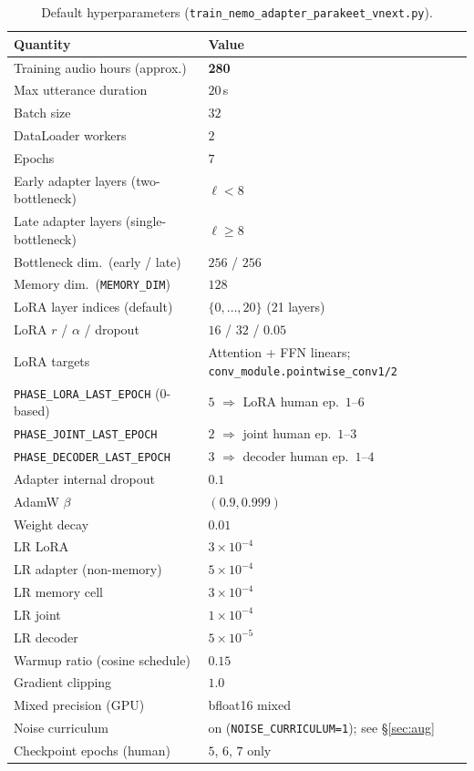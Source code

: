 \documentclass[11pt,a4paper]{article}
\begin{document}
\begin{table}[htbp]
  \centering
  \caption{Default hyperparameters (\texttt{train\_nemo\_adapter\_parakeet\_vnext.py}).}
  \label{tab:hyp}
  \begin{tabular}{@{}ll@{}}
    \toprule
    Quantity & Value \\
    \midrule
    Training audio hours (approx.) & \textbf{280} \\
    Max utterance duration & $20$\,s \\
    Batch size & $32$ \\
    DataLoader workers & $2$ \\
    Epochs & $7$ \\
    Early adapter layers (two-bottleneck) & $\ell < 8$ \\
    Late adapter layers (single-bottleneck) & $\ell \geq 8$ \\
    Bottleneck dim.\ (early / late) & $256$ / $256$ \\
    Memory dim.\ (\texttt{MEMORY\_DIM}) & $128$ \\
    LoRA layer indices (default) & $\{0,\ldots,20\}$ (21 layers) \\
    LoRA $r$ / $\alpha$ / dropout & $16$ / $32$ / $0.05$ \\
    LoRA targets & Attention + FFN linears; \texttt{conv\_module.pointwise\_conv1/2} \\
    \texttt{PHASE\_LORA\_LAST\_EPOCH} (0-based) & $5$ $\Rightarrow$ LoRA human ep.\ $1$--$6$ \\
    \texttt{PHASE\_JOINT\_LAST\_EPOCH} & $2$ $\Rightarrow$ joint human ep.\ $1$--$3$ \\
    \texttt{PHASE\_DECODER\_LAST\_EPOCH} & $3$ $\Rightarrow$ decoder human ep.\ $1$--$4$ \\
    Adapter internal dropout & $0.1$ \\
    AdamW $\beta$ & $(0.9, 0.999)$ \\
    Weight decay & $0.01$ \\
    LR LoRA & $3\times 10^{-4}$ \\
    LR adapter (non-memory) & $5\times 10^{-4}$ \\
    LR memory cell & $3\times 10^{-4}$ \\
    LR joint & $1\times 10^{-4}$ \\
    LR decoder & $5\times 10^{-5}$ \\
    Warmup ratio (cosine schedule) & $0.15$ \\
    Gradient clipping & $1.0$ \\
    Mixed precision (GPU) & bfloat16 mixed \\
    Noise curriculum & on (\texttt{NOISE\_CURRICULUM=1}); see \S\ref{sec:aug} \\
    Checkpoint epochs (human) & $5$, $6$, $7$ only \\
    \bottomrule
  \end{tabular}
\end{table}
\end{document}
